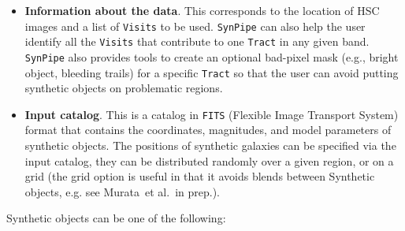 \documentclass[useamsfonts]{pasj01}
\def\etal{{\ et al.~}}
\def\synpipe{\texttt{SynPipe}}
\def\tract{\texttt{Tract}}
\def\visits{\texttt{Visits}}
\begin{document}
    \begin{itemize}

        \item \textbf{Information about the data}. 
            This  corresponds to the location of HSC images and a list of \visits{} to 
            be used. 
            \synpipe{} can also help the user identify all the \visits{} that contribute 
            to one \tract{} in any given band.
            \synpipe{} also provides tools to create an optional bad-pixel mask
            (e.g., bright object, bleeding trails) for a specific \tract{} so that
            the user can avoid putting synthetic objects on problematic regions.

        \item \textbf{Input catalog}. 
            This is a catalog in \texttt{FITS} (Flexible Image Transport System)
            format that contains the coordinates, magnitudes, and model parameters of 
            synthetic objects.  
            The positions of synthetic galaxies can be specified via the input catalog, 
            they can be distributed randomly over a given region, or on a grid 
            (the grid option is useful in that it avoids blends between Synthetic 
            objects, e.g. see Murata\etal in prep.).  
            
    \end{itemize}

    \vspace{0.5cm}
    \noindent Synthetic objects can be one of the following:
\end{document}
